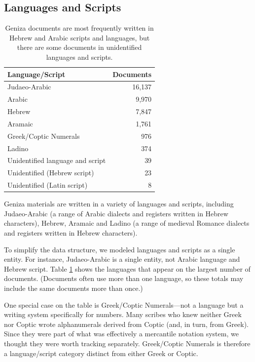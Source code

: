 \documentclass{article}
\begin{document}
\subsection{Languages and Scripts}

\begin{table}
\begin{center}
\caption{Geniza documents are most frequently written in Hebrew and Arabic scripts and languages, but there are some documents in unidentified languages and scripts.}
\label{table:langs_docs}
\begin{tabular}{lr}
\toprule
Language/Script & Documents \\
\midrule
Judaeo-Arabic & 16,137 \\
Arabic & 9,970 \\
Hebrew & 7,847 \\
Aramaic & 1,761 \\
Greek/Coptic Numerals & 976 \\
Ladino & 374 \\
\midrule
Unidentified language and script & 39 \\
Unidentified (Hebrew script) & 23 \\
Unidentified (Latin script) & 8 \\
\bottomrule
\end{tabular}
\end{center}
\end{table}


Geniza materials are written in a variety of languages and scripts, including Judaeo-Arabic (a range of Arabic dialects and registers written in Hebrew characters), Hebrew, Aramaic and Ladino (a range of medieval Romance dialects and registers written in Hebrew characters).

To simplify the data structure, we modeled languages and scripts as a single entity. For instance, Judaeo-Arabic is a single entity, not Arabic language and Hebrew script. Table \ref{table:langs_docs} shows the languages that appear on the largest number of documents. (Documents often use more than one language, so these totals may include the same documents more than once.) 

One special case on the table is Greek/Coptic Numerals—not a language but a writing system specifically for numbers. Many scribes who knew neither Greek nor Coptic wrote alphanumerals derived from Coptic (and, in turn, from Greek). Since they were part of what was effectively a mercantile notation system, we thought they were worth tracking separately. Greek/Coptic Numerals is therefore a language/script category distinct from either Greek or Coptic.
\end{document}

